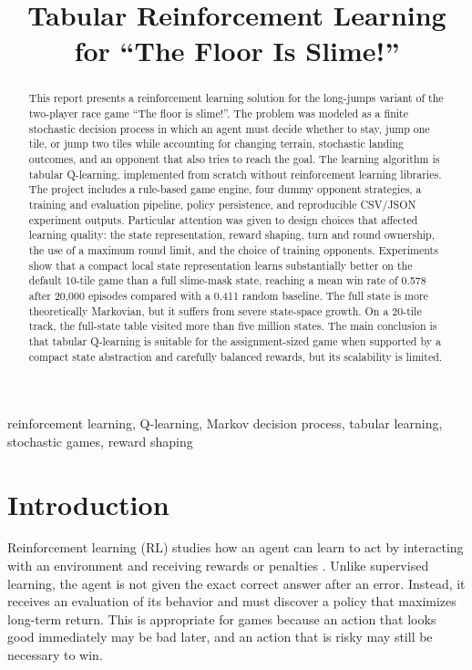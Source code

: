 \documentclass[conference]{IEEEtran}
\title{Tabular Reinforcement Learning for ``The Floor Is Slime!''}
\author{
\IEEEauthorblockN{Alejandro León Martín Lama}
\IEEEauthorblockA{
Artificial Intelligence 2025/26\\
Universidad de Sevilla\\
Seville, Spain\\
alemarlam@alum.us.es}
}
\begin{document}
\maketitle

\begin{abstract}
This report presents a reinforcement learning solution for the long-jumps variant
of the two-player race game ``The floor is slime!''. The problem was modeled as a
finite stochastic decision process in which an agent must decide whether to stay,
jump one tile, or jump two tiles while accounting for changing terrain, stochastic
landing outcomes, and an opponent that also tries to reach the goal. The learning
algorithm is tabular Q-learning, implemented from scratch without reinforcement
learning libraries. The project includes a rule-based game engine, four dummy
opponent strategies, a training and evaluation pipeline, policy persistence, and
reproducible CSV/JSON experiment outputs. Particular attention was given to design
choices that affected learning quality: the state representation, reward shaping,
turn and round ownership, the use of a maximum round limit, and the choice of
training opponents. Experiments show that a compact local state representation
learns substantially better on the default 10-tile game than a full slime-mask
state, reaching a mean win rate of 0.578 after 20,000 episodes compared with a
0.411 random baseline. The full state is more theoretically Markovian, but it
suffers from severe state-space growth. On a 20-tile track, the full-state table
visited more than five million states. The main conclusion is that tabular
Q-learning is suitable for the assignment-sized game when supported by a compact
state abstraction and carefully balanced rewards, but its scalability is limited.
\end{abstract}

\begin{IEEEkeywords}
reinforcement learning, Q-learning, Markov decision process, tabular learning,
stochastic games, reward shaping
\end{IEEEkeywords}

\section{Introduction}

Reinforcement learning (RL) studies how an agent can learn to act by interacting
with an environment and receiving rewards or penalties \cite{sanchoQLearning}.
Unlike supervised learning, the agent is not given the exact correct answer after
an error. Instead, it receives an evaluation of its behavior and must discover a
policy that maximizes long-term return. This is appropriate for games because an
action that looks good immediately may be bad later, and an action that is risky
may still be necessary to win.
\end{document}
